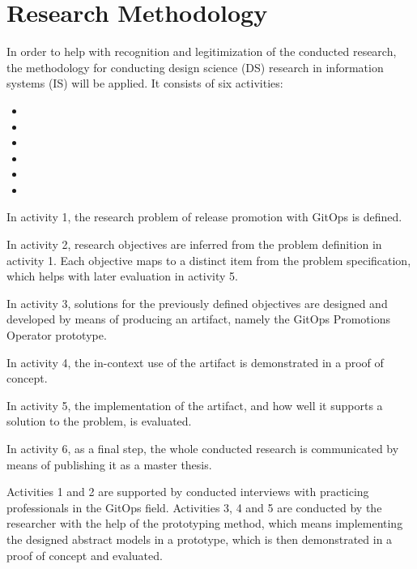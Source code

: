 \section{Research Methodology}
\label{introduction:research-methodology}


In order to help with recognition and legitimization of the conducted research,
the methodology for conducting design science (DS) research
in information systems (IS)
\autocite{designScienceResearchMethodologyForInformationSystemsResearch}
will be applied.
It consists of six activities:

\begin{itemize}
	\item {}
	\item {}
	\item {}
	\item {}
	\item {}
	\item {}
\end{itemize}

In activity 1,
the research problem of
release promotion with GitOps
is defined.

In activity 2,
research objectives are inferred from the problem definition in activity 1.
Each objective maps to a distinct item from the problem specification,
which helps with later evaluation in activity 5.

In activity 3,
solutions for the previously defined objectives are designed and developed
by means of producing an artifact, namely the GitOps Promotions Operator prototype.

In activity 4,
the in-context use of the artifact is demonstrated in a proof of concept.

In activity 5,
the implementation of the artifact,
and how well it supports a solution to the problem,
is evaluated.

In activity 6, as a final step,
the whole conducted research is communicated by means of
publishing it as a master thesis.

Activities 1 and 2 are supported by conducted interviews with practicing professionals in the GitOps field.
Activities 3, 4 and 5 are conducted by the researcher with the help of the prototyping method,
which means implementing the designed abstract models in a prototype, which is then demonstrated in a proof of concept and evaluated.




